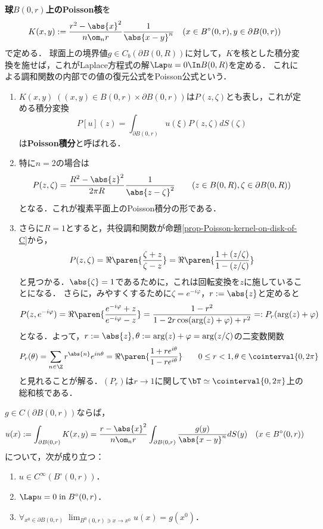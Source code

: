 \documentclass[uplatex,dvipdfmx]{jsreport}
\begin{document}
\begin{definition}[球上のPoisson核が与えるPoissonの公式]
    \textbf{球$B(0,r)$上のPoisson核}を
    \[K(x,y):=\frac{r^2-\abs{x}^2}{n\om_nr}\frac{1}{\abs{x-y}^n}\quad(x\in B^\circ(0,r),y\in\partial B(0,r))\]
    で定める．
    球面上の境界値$g\in C_b(\partial B(0,R))$に対して，$K$を核とした積分変換を施せば，これがLaplace方程式の解$\Lap u=0\In B(0,R)$を定める．
    これによる調和関数の内部での値の復元公式をPoisson公式という．
\end{definition}
\begin{remarks}[Poisson総和核としての表示]\mbox{}
    \begin{enumerate}
        \item $K(x,y)\;((x,y)\in B(0,r)\times\partial B(0,r))$は$P(z,\zeta)$とも表し，これが定める積分変換
        \[P[u](z)=\int_{\partial B(0,r)}u(\xi)P(z,\zeta)dS(\zeta)\]
        は\textbf{Poisson積分}と呼ばれる．
        \item 特に$n=2$の場合は
        \[P(z,\zeta)=\frac{R^2-\abs{z}^2}{2\pi R}\frac{1}{\abs{z-\zeta}^2}\qquad(z\in B(0,R),\zeta\in\partial B(0,R))\]
        となる．これが複素平面上のPoisson積分の形である．
        \item さらに$R=1$とすると，共役調和関数が命題\ref{prop-Poisson-kernel-on-disk-of-C}から，
        \[P(z,\zeta)=\Re\paren{\frac{\zeta+z}{\zeta-z}}=\Re\paren{\frac{1+(z/\zeta)}{1-(z/\zeta)}}\]
        と見つかる．$\abs{\zeta}=1$であるために，これは回転変換を$z$に施していることになる．
        さらに，みやすくするために$\zeta=e^{-i\varphi}$，$r:=\abs{z}$と定めると
        \[P(z,e^{-i\varphi})=\Re\paren{\frac{e^{-i\varphi}+z}{e^{-i\varphi}-z}}=\frac{1-r^2}{1-2r\cos(\arg(z)+\varphi)+r^2}=:P_r(\arg(z)+\varphi)\]
        となる．よって，$r:=\abs{z},\theta:=\arg(z)+\varphi=\arg(z/\zeta)$の二変数関数
        \[P_r(\theta)=\sum_{n\in\Z}r^{\abs{n}}e^{in\theta}=\Re\paren{\frac{1+re^{i\theta}}{1-re^{i\theta}}}\qquad0\le r<1,\theta\in\cointerval{0,2\pi}\]
        と見れることが解る．$(P_r)$は$r\to1$に関して$\bT\simeq\cointerval{0,2\pi}$上の総和核である．
    \end{enumerate}
\end{remarks}

\begin{theorem}\label{thm-Green-function-on-disk}
    $g\in C(\partial B(0,r))$ならば，
    \[u(x):=\int_{\partial B(0,r)}K(x,y)=\frac{r-\abs{x}^2}{n\om_nr}\int_{\partial B(0,r)}\frac{g(y)}{\abs{x-y}^n}dS(y)\quad(x\in B^\circ(0,r))\]
    について，次が成り立つ：
    \begin{enumerate}
        \item $u\in C^\infty(B^\circ(0,r))$．
        \item $\Lap u=0\;\text{in}\;B^\circ(0,r)$．
        \item $\forall_{x^0\in \partial B(0,r)}\;\lim_{B^0(0,r)\ni x\to x^0}u(x)=g(x^0)$．
    \end{enumerate}
\end{theorem}
\end{document}
